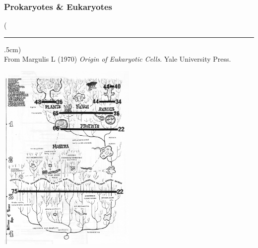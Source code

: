 \documentclass[10pt]{beamer}
\newenvironment{reference}[2]{%
	\begin{textblock*}{\textwidth}(#1,#2)
		\tiny\bgroup\color{gray}}{\egroup\end{textblock*}}
\begin{document}
\begin{frame}[t]
\frametitle{Prokaryotes \& Eukaryotes}

	\begin{reference}{4mm}{92mm}
		\rule{1.5cm}{0.25pt}\\
		From Margulis L (1970) \emph{Origin of Eukaryotic Cells}. Yale University Press.
	\end{reference}

	\begin{center}
		\includegraphics[width=0.5\textwidth]{figures/margulisTree.pdf}
	\end{center}
\end{frame}
\end{document}
